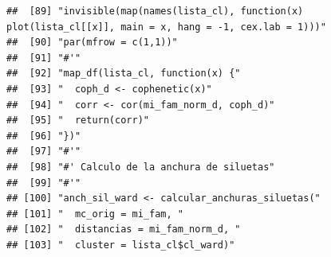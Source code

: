 \documentclass[11pt,]{article}
\begin{document}
\begin{verbatim}
##  [89] "invisible(map(names(lista_cl), function(x) plot(lista_cl[[x]], main = x, hang = -1, cex.lab = 1)))"                                                                    
##  [90] "par(mfrow = c(1,1))"                                                                                                                                                   
##  [91] "#'"                                                                                                                                                                    
##  [92] "map_df(lista_cl, function(x) {"                                                                                                                                        
##  [93] "  coph_d <- cophenetic(x)"                                                                                                                                             
##  [94] "  corr <- cor(mi_fam_norm_d, coph_d)"                                                                                                                                  
##  [95] "  return(corr)"                                                                                                                                                        
##  [96] "})"                                                                                                                                                                    
##  [97] "#'"                                                                                                                                                                    
##  [98] "#' Calculo de la anchura de siluetas"                                                                                                                                  
##  [99] "#'"                                                                                                                                                                    
## [100] "anch_sil_ward <- calcular_anchuras_siluetas("                                                                                                                          
## [101] "  mc_orig = mi_fam, "                                                                                                                                                  
## [102] "  distancias = mi_fam_norm_d, "                                                                                                                                        
## [103] "  cluster = lista_cl$cl_ward)"                                                                                                                                         

\end{verbatim}
\end{document}
